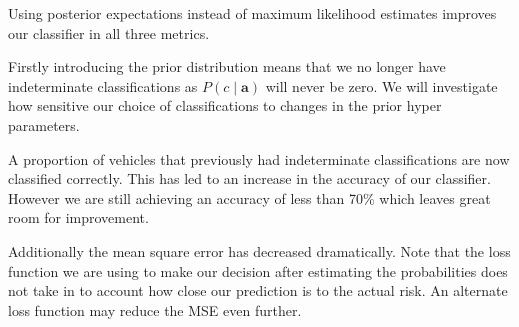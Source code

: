 Using posterior expectations instead of maximum likelihood estimates improves our classifier in all three metrics.

Firstly introducing the prior distribution means that we no longer have indeterminate classifications as $P(c \mid \mathbf{a})$ will never be zero.
We will investigate how sensitive our choice of classifications to changes in the prior hyper parameters.

A proportion of vehicles that previously had indeterminate classifications are now classified correctly.
This has led to an increase in the accuracy of our classifier.
However we are still achieving an accuracy of less than 70\% which leaves great room for improvement.

Additionally the mean square error has decreased dramatically.
Note that the loss function we are using to make our decision after estimating the probabilities does not take in to account how close our prediction is to the actual risk.
An alternate loss function may reduce the MSE even further.